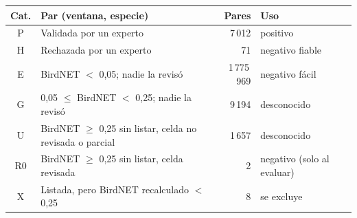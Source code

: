 \begin{tabular}{clrl}
\toprule
Cat. & Par (ventana, especie) & Pares & Uso\\
\midrule
P & Validada por un experto & 7\,012 & positivo\\
H & Rechazada por un experto & 71 & negativo fiable\\
E & BirdNET $<$ 0{,}05; nadie la revis\'o & 1\,775\,969 & negativo f\'acil\\
G & 0{,}05 $\leq$ BirdNET $<$ 0{,}25; nadie la revis\'o & 9\,194 & desconocido\\
U & BirdNET $\geq$ 0{,}25 sin listar, celda no revisada o parcial & 1\,657 & desconocido\\
R0 & BirdNET $\geq$ 0{,}25 sin listar, celda revisada & 2 & negativo (solo al evaluar)\\
X & Listada, pero BirdNET recalculado $<$ 0{,}25 & 8 & se excluye\\
\bottomrule
\end{tabular}
